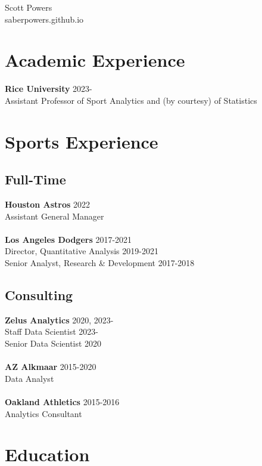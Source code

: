 \documentclass{article}
\begin{document}
\begin{center}
{\huge \sc Scott Powers}\\
saberpowers.github.io
\end{center}


\section*{\sc Academic Experience}

{\bf Rice University} \hfill 2023-\\
Assistant Professor of Sport Analytics and (by courtesy) of Statistics


\section*{\sc Sports Experience}

\subsection*{\sc Full-Time}

{\bf Houston Astros} \hfill 2022\\
Assistant General Manager\\
~\\
{\bf Los Angeles Dodgers} \hfill 2017-2021\\
Director, Quantitative Analysis \hfill {\color{gray} 2019-2021}\\
Senior Analyst, Research \& Development \hfill {\color{gray} 2017-2018}

\subsection*{\sc Consulting}

{\bf Zelus Analytics} \hfill 2020, 2023-\\
Staff Data Scientist \hfill {\color{gray}2023-}\\
Senior Data Scientist \hfill {\color{gray}2020}\\
~\\
{\bf AZ Alkmaar} \hfill 2015-2020\\
Data Analyst\\
~\\
{\bf Oakland Athletics} \hfill 2015-2016\\
Analytics Consultant

\section*{\sc Education}
\end{document}
